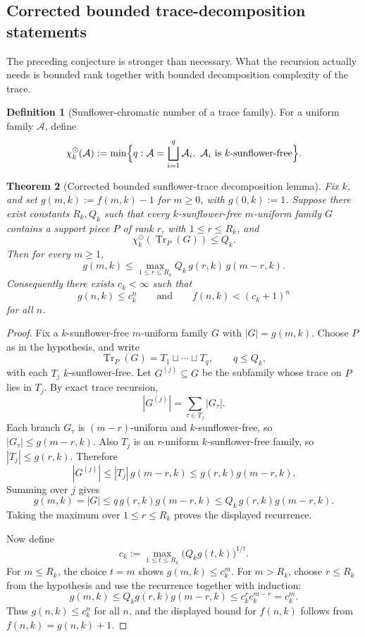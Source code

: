 \documentclass[11pt]{article}
\newtheorem{theorem}{Theorem}[section]
\theoremstyle{definition}
\newtheorem{definition}[theorem]{Definition}
\newcommand{\Tr}{\operatorname{Tr}}
\newcommand{\1}{\mathbf{1}}
\begin{document}
\subsection*{Corrected bounded trace-decomposition statements}
The preceding conjecture is stronger than necessary. What the recursion actually needs is bounded rank together with bounded decomposition complexity of the trace.

\begin{definition}[Sunflower-chromatic number of a trace family]
For a uniform family $\mathcal A$, define
\[
\chi_k^\odot(\mathcal A):=\min\Bigl\{q: \mathcal A=\bigsqcup_{i=1}^q \mathcal A_i,\ \mathcal A_i\text{ is }k\text{-sunflower-free}\Bigr\}.
\]
\end{definition}

\begin{theorem}[Corrected bounded sunflower-trace decomposition lemma]\label{thm:corrected-trace-piece}
Fix $k$, and set $g(m,k):=f(m,k)-1$ for $m\ge 0$, with $g(0,k):=1$. Suppose there exist constants $R_k,Q_k$ such that every $k$-sunflower-free $m$-uniform family $G$ contains a support piece $P$ of rank $r$, with $1\le r\le R_k$, and
\[
\chi_k^\odot(\Tr_P(G))\le Q_k.
\]
Then for every $m\ge 1$,
\[
g(m,k)\le \max_{1\le r\le R_k} Q_k\,g(r,k)\,g(m-r,k).
\]
Consequently there exists $c_k<\infty$ such that
\[
g(n,k)\le c_k^n
\qquad\text{and}\qquad
f(n,k)<(c_k+1)^n
\]
for all $n$.
\end{theorem}

\begin{proof}
Fix a $k$-sunflower-free $m$-uniform family $G$ with $|G|=g(m,k)$. Choose $P$ as in the hypothesis, and write
\[
\Tr_P(G)=T_1\sqcup\cdots\sqcup T_q,
\qquad q\le Q_k,
\]
with each $T_j$ $k$-sunflower-free. Let $G^{(j)}\subseteq G$ be the subfamily whose trace on $P$ lies in $T_j$. By exact trace recursion,
\[
|G^{(j)}|=\sum_{\tau\in T_j}|G_\tau|.
\]
Each branch $G_\tau$ is $(m-r)$-uniform and $k$-sunflower-free, so $|G_\tau|\le g(m-r,k)$. Also $T_j$ is an $r$-uniform $k$-sunflower-free family, so $|T_j|\le g(r,k)$. Therefore
\[
|G^{(j)}|\le |T_j|\,g(m-r,k)\le g(r,k)g(m-r,k).
\]
Summing over $j$ gives
\[
g(m,k)=|G|\le q\,g(r,k)g(m-r,k)\le Q_k\,g(r,k)g(m-r,k).
\]
Taking the maximum over $1\le r\le R_k$ proves the displayed recurrence.

Now define
\[
c_k:=\max_{1\le t\le R_k}\bigl(Q_k g(t,k)\bigr)^{1/t}.
\]
For $m\le R_k$, the choice $t=m$ shows $g(m,k)\le c_k^m$. For $m>R_k$, choose $r\le R_k$ from the hypothesis and use the recurrence together with induction:
\[
g(m,k)\le Q_k g(r,k)g(m-r,k)\le c_k^r c_k^{m-r}=c_k^m.
\]
Thus $g(n,k)\le c_k^n$ for all $n$, and the displayed bound for $f(n,k)$ follows from $f(n,k)=g(n,k)+1$.
\end{proof}
\end{document}
